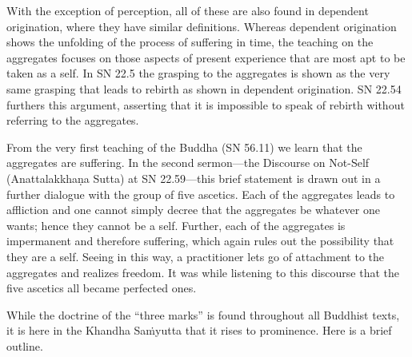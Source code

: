 \documentclass[12pt,openany]{book}%
\begin{document}
With the exception of perception, all of these are also found in dependent origination, where they have similar definitions. Whereas dependent origination shows the unfolding of the process of suffering in time, the teaching on the aggregates focuses on those aspects of present experience that are most apt to be taken as a self. In SN 22.5 the grasping to the aggregates is shown as the very same grasping that leads to rebirth as shown in dependent origination. SN 22.54 furthers this argument, asserting that it is impossible to speak of rebirth without referring to the aggregates.

From the very first teaching of the Buddha (SN 56.11) we learn that the aggregates are suffering. In the second sermon—the Discourse on Not-Self (\textsanskrit{Anattalakkhaṇa} Sutta) at SN 22.59—this brief statement is drawn out in a further dialogue with the group of five ascetics. Each of the aggregates leads to affliction and one cannot simply decree that the aggregates be whatever one wants; hence they cannot be a self. Further, each of the aggregates is impermanent and therefore suffering, which again rules out the possibility that they are a self. Seeing in this way, a practitioner lets go of attachment to the aggregates and realizes freedom. It was while listening to this discourse that the five ascetics all became perfected ones.

While the doctrine of the “three marks” is found throughout all Buddhist texts, it is here in the Khandha \textsanskrit{Saṁyutta} that it rises to prominence. Here is a brief outline.
\end{document}
